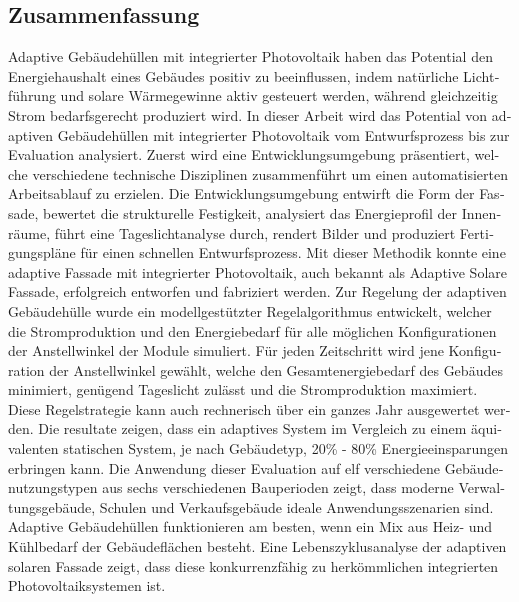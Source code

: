 \begingroup
\let\clearpage\relax
\let\cleardoublepage\relax
\let\cleardoublepage\relax

\begin{otherlanguage}{ngerman}
\chapter*{Zusammenfassung}

Adaptive Geb{\"a}udeh{\"u}llen mit integrierter Photovoltaik haben das Potential den Energiehaushalt eines Geb{\"a}udes positiv zu beeinflussen, indem nat{\"u}rliche Lichtf{\"u}hrung und solare W{\"a}rmegewinne aktiv gesteuert werden, w{\"a}hrend gleichzeitig Strom bedarfsgerecht produziert wird.
In dieser Arbeit wird das Potential von adaptiven Geb{\"a}udeh{\"u}llen mit integrierter Photovoltaik vom Entwurfsprozess bis zur Evaluation analysiert.
Zuerst wird eine Entwicklungsumgebung pr{\"a}sentiert, welche verschiedene technische Disziplinen zusammenf{\"u}hrt um einen automatisierten Arbeitsablauf zu erzielen.
Die Entwicklungsumgebung entwirft die Form der Fassade, bewertet die  strukturelle Festigkeit, analysiert das Energieprofil der Innenr{\"a}ume, f{\"u}hrt eine Tageslichtanalyse durch, rendert Bilder und produziert Fertigungspl{\"a}ne f{\"u}r einen schnellen Entwurfsprozess.
Mit dieser Methodik konnte eine adaptive Fassade mit integrierter Photovoltaik, auch bekannt als Adaptive Solare Fassade, erfolgreich entworfen und fabriziert werden.
Zur Regelung der adaptiven Geb{\"a}udeh{\"u}lle wurde ein modellgest{\"u}tzter Regelalgorithmus entwickelt, welcher die Stromproduktion und den Energiebedarf f{\"u}r alle m{\"o}glichen Konfigurationen der Anstellwinkel der Module simuliert.
F{\"u}r jeden Zeitschritt wird jene Konfiguration der Anstellwinkel gew{\"a}hlt, welche den Gesamtenergiebedarf des Geb{\"a}udes minimiert, gen{\"u}gend Tageslicht zul{\"a}sst und die Stromproduktion maximiert.
Diese Regelstrategie kann auch rechnerisch {\"u}ber ein ganzes Jahr ausgewertet werden. Die resultate zeigen, dass ein adaptives System im Vergleich zu einem {\"a}quivalenten statischen System, je nach Geb{\"a}udetyp, 20\% - 80\% Energieeinsparungen erbringen kann.
Die Anwendung dieser Evaluation auf elf verschiedene Geb{\"a}udenutzungstypen aus sechs verschiedenen Bauperioden zeigt, dass moderne Verwaltungsgeb{\"a}ude, Schulen und Verkaufsgeb{\"a}ude ideale Anwendungsszenarien sind.
Adaptive Geb{\"a}udeh{\"u}llen funktionieren am besten, wenn ein Mix aus Heiz- und K{\"u}hlbedarf der Geb{\"a}udefl{\"a}chen besteht.
Eine Lebenszyklusanalyse der adaptiven solaren Fassade zeigt, dass diese konkurrenzf{\"a}hig zu herk{\"o}mmlichen integrierten Photovoltaiksystemen ist.

\end{otherlanguage}

\endgroup

\vfill